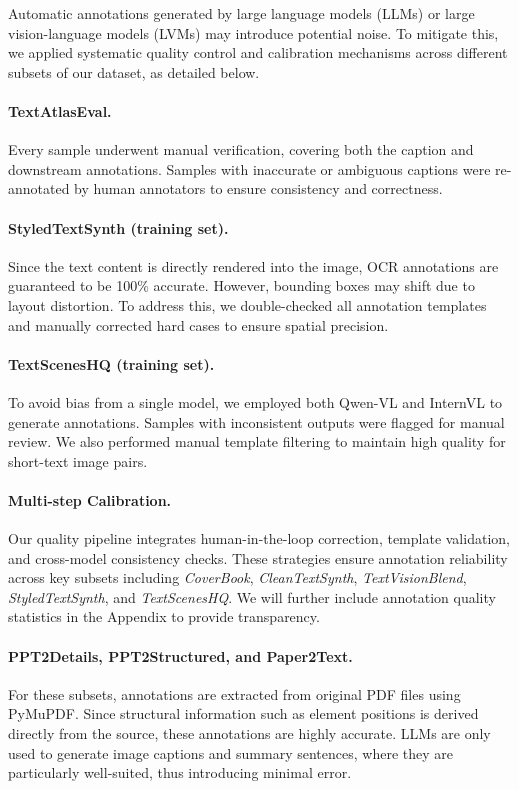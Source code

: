 Automatic annotations generated by large language models (LLMs) or large vision-language models (LVMs) may introduce potential noise. 
To mitigate this, we applied systematic quality control and calibration mechanisms across different subsets of our dataset, as detailed below.

\paragraph{TextAtlasEval.}  
Every sample underwent manual verification, covering both the caption and downstream annotations. 
Samples with inaccurate or ambiguous captions were re-annotated by human annotators to ensure consistency and correctness.

\paragraph{StyledTextSynth (training set).}  
Since the text content is directly rendered into the image, OCR annotations are guaranteed to be 100\% accurate. 
However, bounding boxes may shift due to layout distortion. 
To address this, we double-checked all annotation templates and manually corrected hard cases to ensure spatial precision.

\paragraph{TextScenesHQ (training set).}  
To avoid bias from a single model, we employed both Qwen-VL and InternVL to generate annotations. 
Samples with inconsistent outputs were flagged for manual review. 
We also performed manual template filtering to maintain high quality for short-text image pairs.

\paragraph{Multi-step Calibration.}  
Our quality pipeline integrates human-in-the-loop correction, template validation, and cross-model consistency checks. 
These strategies ensure annotation reliability across key subsets including \textit{CoverBook}, \textit{CleanTextSynth}, \textit{TextVisionBlend}, \textit{StyledTextSynth}, and \textit{TextScenesHQ}. 
We will further include annotation quality statistics in the Appendix to provide transparency.

\paragraph{PPT2Details, PPT2Structured, and Paper2Text.}  
For these subsets, annotations are extracted from original PDF files using PyMuPDF. 
Since structural information such as element positions is derived directly from the source, these annotations are highly accurate. 
LLMs are only used to generate image captions and summary sentences, where they are particularly well-suited, thus introducing minimal error.

